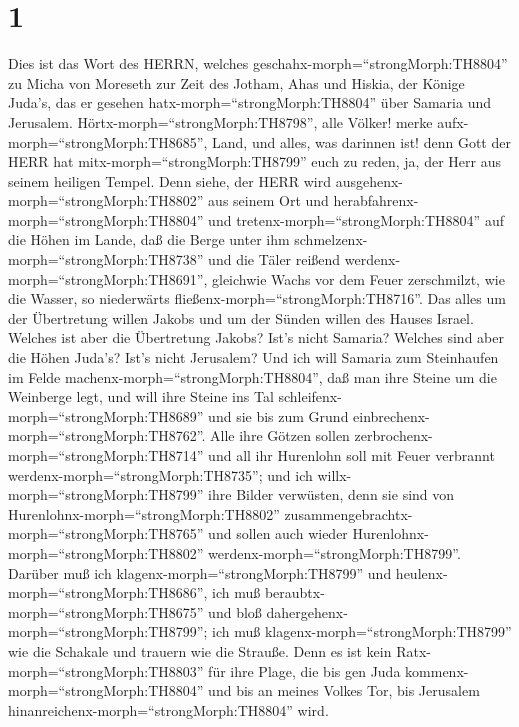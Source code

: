 \hypertarget{section}{%
\section{1}\label{section}}

 Dies ist das Wort des HERRN, welches
geschahx-morph=``strongMorph:TH8804'' zu Micha von Moreseth zur Zeit des
Jotham, Ahas und Hiskia, der Könige Juda's, das er gesehen
hatx-morph=``strongMorph:TH8804'' über Samaria und Jerusalem.
 Hörtx-morph=``strongMorph:TH8798'', alle Völker! merke
aufx-morph=``strongMorph:TH8685'', Land, und alles, was darinnen ist!
denn Gott der HERR hat mitx-morph=``strongMorph:TH8799'' euch zu reden,
ja, der Herr aus seinem heiligen Tempel.  Denn siehe, der
HERR wird ausgehenx-morph=``strongMorph:TH8802'' aus seinem Ort und
herabfahrenx-morph=``strongMorph:TH8804'' und
tretenx-morph=``strongMorph:TH8804'' auf die Höhen im Lande,
 daß die Berge unter ihm
schmelzenx-morph=``strongMorph:TH8738'' und die Täler reißend
werdenx-morph=``strongMorph:TH8691'', gleichwie Wachs vor dem Feuer
zerschmilzt, wie die Wasser, so niederwärts
fließenx-morph=``strongMorph:TH8716''.  Das alles um der
Übertretung willen Jakobs und um der Sünden willen des Hauses Israel.
Welches ist aber die Übertretung Jakobs? Ist's nicht Samaria? Welches
sind aber die Höhen Juda's? Ist's nicht Jerusalem?  Und ich
will Samaria zum Steinhaufen im Felde
machenx-morph=``strongMorph:TH8804'', daß man ihre Steine um die
Weinberge legt, und will ihre Steine ins Tal
schleifenx-morph=``strongMorph:TH8689'' und sie bis zum Grund
einbrechenx-morph=``strongMorph:TH8762''.  Alle ihre Götzen
sollen zerbrochenx-morph=``strongMorph:TH8714'' und all ihr Hurenlohn
soll mit Feuer verbrannt werdenx-morph=``strongMorph:TH8735''; und ich
willx-morph=``strongMorph:TH8799'' ihre Bilder verwüsten, denn sie sind
von Hurenlohnx-morph=``strongMorph:TH8802''
zusammengebrachtx-morph=``strongMorph:TH8765'' und sollen auch wieder
Hurenlohnx-morph=``strongMorph:TH8802''
werdenx-morph=``strongMorph:TH8799''.  Darüber muß ich
klagenx-morph=``strongMorph:TH8799'' und
heulenx-morph=``strongMorph:TH8686'', ich muß
beraubtx-morph=``strongMorph:TH8675'' und bloß
dahergehenx-morph=``strongMorph:TH8799''; ich muß
klagenx-morph=``strongMorph:TH8799'' wie die Schakale und trauern wie
die Strauße.  Denn es ist kein
Ratx-morph=``strongMorph:TH8803'' für ihre Plage, die bis gen Juda
kommenx-morph=``strongMorph:TH8804'' und bis an meines Volkes Tor, bis
Jerusalem hinanreichenx-morph=``strongMorph:TH8804'' wird. 
